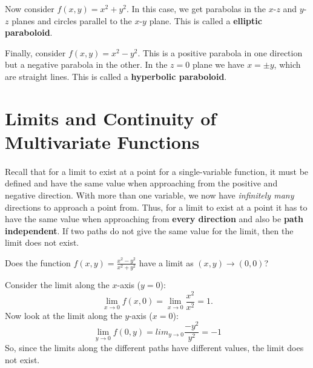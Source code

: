 \documentclass[../multivariate_calculus.tex]{subfiles}
\begin{document}
        \begin{example}
            Now consider $f(x,y)=x^2+y^2$.
            In this case, we get parabolas in the $x$-$z$ and $y$-$z$ planes and circles parallel to the $x$-$y$ plane.
            This is called a \textbf{elliptic paraboloid}.
        \end{example}
        \begin{example}
            Finally, consider $f(x,y)=x^2-y^2$.
            This is a positive parabola in one direction but a negative parabola in the other.
            In the $z=0$ plane we have $x=\pm y$, which are straight lines.
            This is called a \textbf{hyperbolic paraboloid}.
        \end{example}

    \section{Limits and Continuity of Multivariate Functions}
        \paragraph{}
        Recall that for a limit to exist at a point for a single-variable function, it must be defined and have the same value when approaching from the positive and negative direction.
        With more than one variable, we now have \textit{infinitely many} directions to approach a point from.
        Thus, for a limit to exist at a point it has to have the same value when approaching from \textbf{every direction} and also be \textbf{path independent}.
        If two paths do not give the same value for the limit, then the limit does not exist.
        \begin{example}
            Does the function $f(x,y)=\frac{x^2-y^2}{x^2+y^2}$ have a limit as $(x,y)\to(0,0)$?

            Consider the limit along the $x$-axis ($y=0$):
            \begin{equation}
                \lim_{x\to0}f(x,0)=\lim_{x\to0}\frac{x^2}{x^2}=1.
            \end{equation}
            Now look at the limit along the $y$-axis ($x=0$):
            \begin{equation}
                \lim_{y\to0}f(0,y)=lim_{y\to0}\frac{-y^2}{y^2}=-1
            \end{equation}
            So, since the limits along the different paths have different values, the limit does not exist.
        \end{example}
\end{document}
